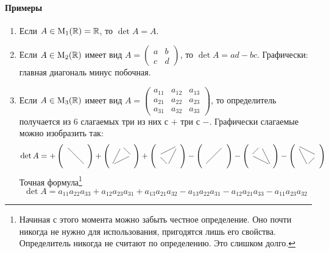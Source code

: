 \documentclass{article}
\begin{document}
\paragraph{Примеры} 
\begin{enumerate}
	\item Если $A\in \operatorname{M}_{1}(\mathbb R) = \mathbb R$, то $\det A = A$.
	\item Если $A \in \operatorname{M}_{2}(\mathbb R)$ имеет вид $A = \left(\begin{smallmatrix}{a}&{b}\\{c}&{d}\end{smallmatrix}\right)$, то $\det A = ad - bc$. Графически: главная диагональ минус побочная.
	\item Если $A\in \operatorname{M}_{3}(\mathbb R)$ имеет вид $A = \left(\begin{smallmatrix}{a_{11}}&{a_{12}}&{a_{13}}\\{a_{21}}&{a_{22}}&{a_{23}}\\{a_{31}}&{a_{32}}&{a_{33}}\end{smallmatrix}\right)$, то определитель получается из $6$ слагаемых три из них с $+$ три с $-$. Графически слагаемые можно изобразить так:
	\[
	\det A = 
	+
	\left(
	\parbox{6pt}{
		\xymatrix@R=6pt@C=6pt{
			{}\ar@{-}[ddrr]&{}&{}\\
			{}&{}&{}\\
			{}&{}&{}\\
	}}
	\right) +
	\left(
	\parbox{6pt}{
		\xymatrix@R=6pt@C=6pt{
			{}&{}\ar@{-}[dr]&{}\\
			{}&{}&{}\ar@{-}[dll]\\
			{}\ar@{-}[uur]&{}&{}\\
	}}
	\right) +
	\left(
	\parbox{6pt}{
		\xymatrix@R=6pt@C=6pt{
			{}&{}&{}\ar@{-}[ddl]\\
			{}\ar@{-}[urr]&{}&{}\\
			{}&{}\ar@{-}[ul]&{}\\
	}}
	\right) -
	\left(
	\parbox{6pt}{
		\xymatrix@R=6pt@C=6pt{
			{}&{}&{}\ar@{-}[ddll]\\
			{}&{}&{}\\
			{}&{}&{}\\
	}}
	\right) -
	\left(
	\parbox{6pt}{
		\xymatrix@R=6pt@C=6pt{
			{}&{}\ar@{-}[ddr]&{}\\
			{}\ar@{-}[ur]&{}&{}\\
			{}&{}&{}\ar@{-}[ull]\\
	}}
	\right) -
	\left(
	\parbox{6pt}{
		\xymatrix@R=6pt@C=6pt{
			{}\ar@{-}[drr]&{}&{}\\
			{}&{}&{}\ar@{-}[dl]\\
			{}&{}\ar@{-}[uul]&{}\\
	}}
	\right) 
	\]
	Точная формула\footnote{Начиная с этого момента можно забыть честное определение. Оно почти никогда не нужно для использования, пригодятся лишь его свойства. Определитель никогда не считают по определению. Это слишком долго.}
	\[
	\det A = a_{11}a_{22}a_{33} + a_{12}a_{23}a_{31} + a_{13}a_{21}a_{32} - 
	a_{13}a_{22}a_{31} - a_{12}a_{21}a_{33} - a_{11}a_{23}a_{32}
	\]
\end{enumerate}
\end{document}
